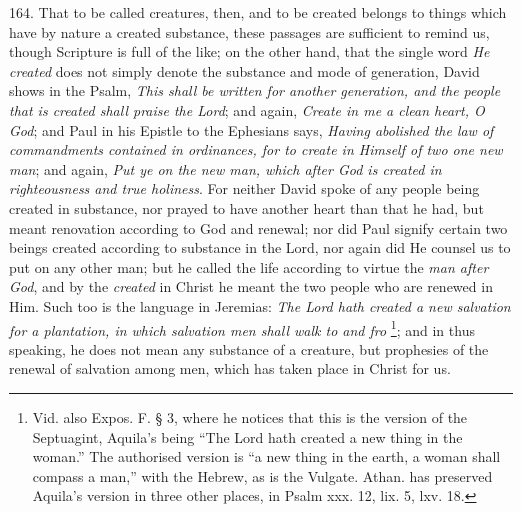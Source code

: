 164. That to be called
creatures, then, and to be created belongs to things which have by
nature a created substance, these passages are sufficient to remind
us, though Scripture is full of the like; on the other hand, that the
single word \emph{He created} does not simply denote the substance and
mode of generation, David shows in the Psalm, \emph{This shall be written
for another generation, and the people that is created shall praise
the Lord}; and again, \emph{Create in me a clean heart, O God}; and
Paul in his Epistle to the Ephesians says, \emph{Having abolished the law
of commandments contained in ordinances, for to create in Himself of
two one new man}; and again, \emph{Put ye on the new man, which after
God is created in righteousness and true holiness}. For neither
David spoke of any people being created in substance, nor prayed to
have another heart than that he had, but meant renovation according to
God and renewal; nor did Paul signify certain two beings created
according to substance in the Lord, nor again did He counsel us to put
on any other man; but he called the life according to virtue the \emph{man
after God}, and by the \emph{created} in Christ he meant the two
people who are renewed in Him. Such too is the language in Jeremias: \emph{The
Lord hath created a new salvation for a plantation, in which salvation
men shall walk to and fro} \footnote{Vid. also Expos. F. § 3, where he notices that this is the version of
the Septuagint, Aquila's being ``The Lord hath created a new thing in
the woman.'' The authorised version is ``a new thing in the earth, a
woman shall compass a man,'' with the Hebrew, as is the Vulgate. Athan.
has preserved Aquila's version in three other places, in Psalm xxx.
12, lix. 5, lxv. 18.}; and in thus speaking, he does not mean any substance of a
creature, but prophesies of the renewal of salvation among men, which
has taken place in Christ for us.

